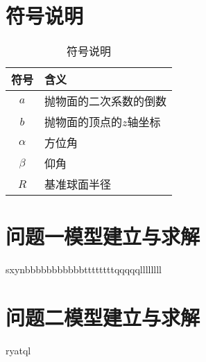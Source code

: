 \documentclass[withoutpreface,bwprint]{cumcmthesis} %
\begin{document}
\section{符号说明}
\begin{table}[H] %
    \begin{center} %
    \caption{符号说明} %
    \begin{tabular}{cl} %
        \toprule %
        \multicolumn{1}{m{3cm}}{\centering 符号} %
        & \multicolumn{1}{m{10cm}}{ 含义} %
        \\ %
        \midrule %
        $a$	&抛物面的二次系数的倒数\\
        $b$	&抛物面的顶点的$z$轴坐标\\
        $\alpha$	&方位角\\
        $\beta$	&仰角\\
        $R$	&基准球面半径\\
         \bottomrule
        \end{tabular} \label{tb:符号说明}%
    \end{center} %
\end{table} %


\section{问题一模型建立与求解}
sxynbbbbbbbbbbbttttttttqqqqqllllllll




\section{问题二模型建立与求解}




\begin{appendices}
ryatql
 
\end{appendices}
\end{document}
